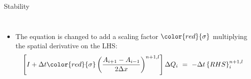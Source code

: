 \begin{frame}{Stability}
\begin{columns}
        \begin{itemize}
        \item The equation is changed to add a scaling factor $\color{red}{\sigma}$ multiplying the spatial derivative on the LHS:
\begin{equation}
  		\left[I+\Delta{t}{\color{red}{\sigma}}\left(\frac{A_{i+1}-A_{i-1}}{2\Delta{x}}\right)^{n+1,l}\right]\Delta{Q}_i~=~-\Delta{t}\left\{RHS\right\}_i^{n+1, l}
\end{equation}


\begin{table}[htp!]
\centering
\label{tab:Scaling}
\end{table}
        \end{itemize}   
    \end{columns}
\end{frame}


